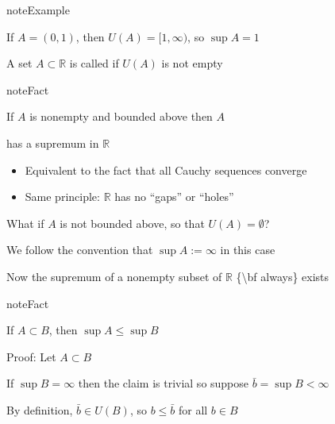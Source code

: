 \documentclass[letterpaper,10pt,english]{jupyterBook}
\begin{document}
\begin{sphinxadmonition}{note}{Example}

\sphinxAtStartPar
If \(A = (0, 1)\), then \(U(A) = [1, \infty)\), so \(\sup A = 1\)
\end{sphinxadmonition}

\sphinxAtStartPar
A set \(A \subset \mathbb{R}\) is called  if \(U(A)\) is not empty

\begin{sphinxadmonition}{note}{Fact}

\sphinxAtStartPar
If \(A\) is nonempty and bounded above then \(A\)
\end{sphinxadmonition}

\sphinxAtStartPar
has a supremum in \(\mathbb{R}\)
\begin{itemize}
\item {} 
\sphinxAtStartPar
Equivalent to the fact that all Cauchy sequences converge

\item {} 
\sphinxAtStartPar
Same principle: \(\mathbb{R}\) has no “gaps” or “holes”

\end{itemize}

\sphinxAtStartPar
What if \(A\) is not bounded above, so that \(U(A) = \emptyset\)?

\sphinxAtStartPar
We follow the convention that \(\sup A := \infty\) in this case

\sphinxAtStartPar
Now the supremum of a nonempty subset of \(\mathbb{R}\) \{\textbackslash{}bf always\} exists

\begin{sphinxadmonition}{note}{Fact}

\sphinxAtStartPar
If \(A \subset B\), then \(\sup A \leq \sup B\)
\end{sphinxadmonition}

\begin{figure}[htbp]
\centering

\noindent{}
\end{figure}

\sphinxAtStartPar
Proof: Let \(A \subset B\)

\sphinxAtStartPar
If \(\sup B = \infty\) then the claim is trivial so suppose \(\bar b = \sup B < \infty\)

\sphinxAtStartPar
By definition, \(\bar b \in U(B)\), so \(b \leq \bar b\) for all \(b \in B\)
\end{document}
